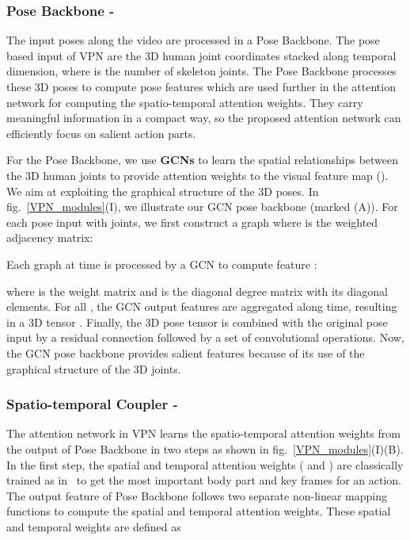 \documentclass[runningheads]{llncs}
\begin{document}
\subsubsection{Pose Backbone -}
The input poses along the video are processed in a Pose Backbone.
The pose based input of VPN are the 3D human joint coordinates  stacked along  temporal dimension, where  is the number of skeleton joints. The Pose Backbone processes these 3D poses to compute pose features  which are used further in the attention network for computing the spatio-temporal attention weights. They carry meaningful information in a compact way, so the proposed attention network can efficiently focus on salient action parts.



 For the Pose Backbone, we use \textbf{GCNs} to learn the spatial relationships between the 3D human joints to provide attention weights to the visual feature map (). We aim at exploiting the graphical structure of the 3D poses. In fig.~\ref{VPN_modules}(I), we illustrate our GCN pose backbone (marked (A)). 
For each pose input  with  joints, we first construct a graph   where  is the  weighted adjacency matrix:

Each graph  at time  is processed by a GCN to compute feature : 

where  is the weight matrix and  is the diagonal degree matrix with  its diagonal elements. For all , the GCN output features  are aggregated along time, resulting in a 3D tensor . \noindent Finally, the 3D pose tensor is combined with the original pose input by a residual connection followed by a set of convolutional operations. Now, the GCN pose backbone provides salient features  because of its use of the graphical structure of the 3D joints.
\subsubsection{Spatio-temporal Coupler -}
 The attention network in VPN learns the spatio-temporal attention weights from the output of Pose Backbone in two steps as shown in fig.~\ref{VPN_modules}(I)(B). In the first step, the spatial and temporal attention weights ( and ) are classically trained as in~\cite{sta_lstm} to get the most important body part and key frames for an action.
 The output feature  of Pose Backbone follows two separate non-linear mapping functions to compute the spatial and temporal attention weights. These spatial  and temporal  weights are defined as 
\end{document}

